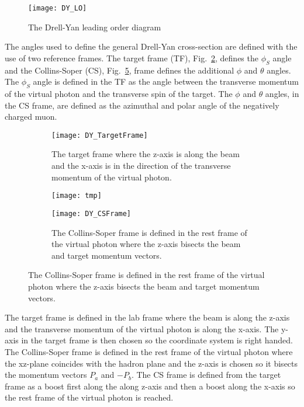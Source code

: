 \begin{figure}[h!t]
  \centering
  \texttt{[image: DY\_LO]}
  \caption{The Drell-Yan leading order diagram}
  \label{fig::DY_LO}
\end{figure}

The angles used to define the general Drell-Yan cross-section are defined with
the use of two reference frames.  The target frame (TF),
Fig.~\ref{fig::DY_TargetFrame}, defines the $\phi_S$ angle and the Collins-Soper
(CS), Fig.~\ref{fig::DY_CSFrame}, frame defines the additional $\phi$ and
$\theta$ angles.  The $\phi_S$ angle is defined in the TF as the angle between
the transverse momentum of the virtual photon and the transverse spin of the
target.  The $\phi$ and $\theta$ angles, in the CS frame, are defined as the
azimuthal and polar angle of the negatively charged muon.

\begin{figure}[h!t]
  \centering
  \begin{subfigure}{.46\textwidth}
    \centering
    \texttt{[image: DY\_TargetFrame]}
    \caption{The target frame where the z-axis is along the beam and the x-axis
      is in the direction of the transverse momentum of the virtual photon.}
    \label{fig::DY_TargetFrame}%
  \end{subfigure}
  \begin{subfigure}{.02\textwidth}
    \centering
    \texttt{[image: tmp]}
    \label{fig::tmp1}%
  \end{subfigure}
  \begin{subfigure}{.46\textwidth}
    \centering
    \texttt{[image: DY\_CSFrame]}
    \caption{The Collins-Soper frame is defined in the rest frame of the virtual
      photon where the z-axis bisects the beam and target momentum vectors.}
    \label{fig::DY_CSFrame}%
  \end{subfigure}
\end{figure}

The target frame is defined in the lab frame where the beam is along the z-axis
and the transverse momentum of the virtual photon is along the x-axis.  The
y-axis in the target frame is then chosen so the coordinate system is right
handed.  The Collins-Soper frame is defined in the rest frame of the virtual
photon where the xz-plane coincides with the hadron plane and the z-axis is
chosen so it bisects the momentum vectors $P_a$ and $-P_b$.  The CS frame is
defined from the target frame as a boost first along the along z-axis and then a
boost along the x-axis so the rest frame of the virtual photon is reached.

